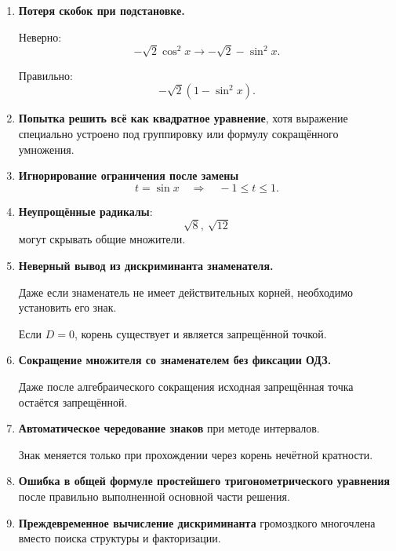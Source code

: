 \documentclass[a4paper,12pt]{article}
\newcommand{\important}[1]{\textbf{\textcolor{darkaccent}{#1}}}
\begin{document}
\begin{enumerate}
    \item \important{Потеря скобок при подстановке.}

    Неверно:
    \[
        -\sqrt2\cos^2x
        \to
        -\sqrt2-\sin^2x.
    \]

    Правильно:
    \[
        -\sqrt2(1-\sin^2x).
    \]

    \item \important{Попытка решить всё как квадратное уравнение}, хотя выражение специально устроено под группировку или формулу сокращённого умножения.

    \item \important{Игнорирование ограничения после замены}
    \[
        t=\sin x
        \quad\Longrightarrow\quad
        -1\le t\le1.
    \]

    \item \important{Неупрощённые радикалы}:
    \[
        \sqrt8,\ \sqrt{12}
    \]
    могут скрывать общие множители.

    \item \important{Неверный вывод из дискриминанта знаменателя.}

    Даже если знаменатель не имеет действительных корней, необходимо установить его знак.

    Если \(D=0\), корень существует и является запрещённой точкой.

    \item \important{Сокращение множителя со знаменателем без фиксации ОДЗ.}

    Даже после алгебраического сокращения исходная запрещённая точка остаётся запрещённой.

    \item \important{Автоматическое чередование знаков} при методе интервалов.

    Знак меняется только при прохождении через корень нечётной кратности.

    \item \important{Ошибка в общей формуле простейшего тригонометрического уравнения} после правильно выполненной основной части решения.

    \item \important{Преждевременное вычисление дискриминанта} громоздкого многочлена вместо поиска структуры и факторизации.
\end{enumerate}

\end{document}
